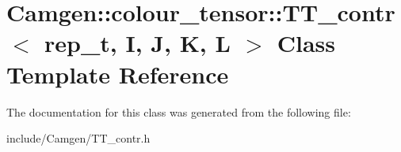 \hypertarget{a00532}{\section{Camgen\-:\-:colour\-\_\-tensor\-:\-:T\-T\-\_\-contr$<$ rep\-\_\-t, I, J, K, L $>$ Class Template Reference}
\label{a00532}
}


The documentation for this class was generated from the following file\-:\begin{DoxyCompactItemize}
\item 
include/\-Camgen/T\-T\-\_\-contr.\-h\end{DoxyCompactItemize}
